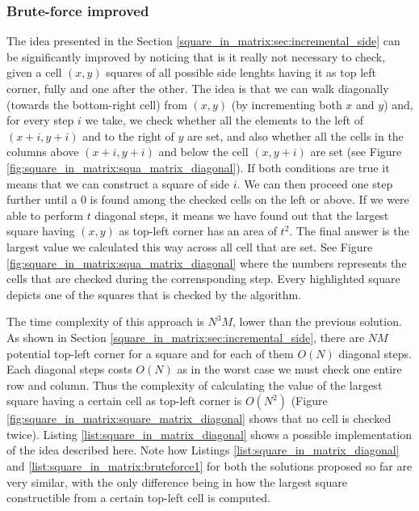 \subsubsection{Brute-force improved}
The idea presented in the Section \ref{square_in_matrix:sec:incremental_side} can be significantly
improved by noticing that is it really not necessary to check, given a cell
$(x,y)$ squares of all
possible side lenghts having it as top left corner, fully and one after the
other.
The idea is that we can walk diagonally (towards the bottom-right cell) from
$(x,y)$ (by incrementing both $x$ and $y$) and, for every step $i$ we take, we check whether all the
elements to the left of $(x+i, y+i)$  and to the right of  $y$ are set, and also whether all the
cells in the columns above $(x+i, y+i)$ and below the cell $(x,y+i)$ are set
(see Figure \ref{fig:square_in_matrix:squa_matrix_diagonal}). If both conditions are
true it means that we can construct a square of side $i$. We can then proceed
one step further until a $0$ is found among the checked cells on the left or
above.
If we were able to perform $t$ diagonal steps, it means we have found out that the largest square having $(x,y)$ as top-left corner has an
area of $t^2$. The final answer is the largest value we calculated this way across all cell that are
set. See Figure \ref{fig:square_in_matrix:squa_matrix_diagonal} where the
numbers represents the cells that are checked during the corrensponding step. Every highlighted square depicts
one of the squares that is checked by the algorithm.


The time complexity of this approach is $N^3M$, lower than the previous solution. As shown in
Section \ref{square_in_matrix:sec:incremental_side}, there are $NM$ potential top-left corner for a
square and for each of them $O(N)$ diagonal steps. Each diagonal steps costs $O(N)$ as in the worst
case we must check one entire row and column. Thus the complexity of calculating
the value of the largest square having a certain cell as top-left corner is
$O(N^2)$ (Figure \ref{fig:square_in_matrix:square_matrix_diagonal} shows that no
cell is checked twice). Listing \ref{list:square_in_matrix_diagonal} shows a
possible implementation of the idea described here. Note how
Listings \ref{list:square_in_matrix_diagonal} and
\ref{list:square_in_matrix:bruteforce1} for both the solutions proposed so far are very
similar, with the only difference being in how the largest
square constructible from a certain top-left cell is computed.

